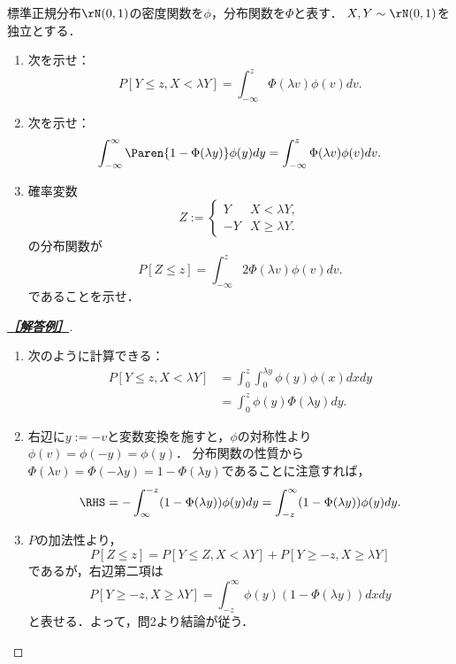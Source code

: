 \documentclass[uplatex,dvipdfmx]{jsarticle}
\begin{document}
\begin{tcolorbox}[colframe=ForestGreen, colback=ForestGreen!10!white,breakable,colbacktitle=ForestGreen!40!white,coltitle=black,fonttitle=\bfseries\sffamily,
    title=第３問]
    \begin{problem}
        標準正規分布$\rN(0,1)$の密度関数を$\phi$，分布関数を$\Phi$と表す．
        $X,Y\sim\rN(0,1)$を独立とする．
        \begin{enumerate}[{問}1]
            \item 次を示せ：
            \[P[Y\le z,X<\lambda Y]=\int^z_{-\infty}\Phi(\lambda v)\phi(v)dv.\]
            \item 次を示せ：
            \[\int^\infty_{-\infty}\Paren{1-\Phi(\lambda y)}\phi(y)dy=\int^z_{-\infty}\Phi(\lambda v)\phi(v)dv.\]
            \item 確率変数
            \[Z:=\begin{cases}
                Y&X<\lambda Y,\\
                -Y&X\ge\lambda Y.
            \end{cases}\]
            の分布関数が
            \[P[Z\le z]=\int^z_{-\infty}2\Phi(\lambda v)\phi(v)dv.\]
            であることを示せ．
        \end{enumerate}
    \end{problem}
\end{tcolorbox}
\begin{proof}[\textbf{\underline{［解答例］}}]\mbox{}
    \begin{enumerate}
        \item 次のように計算できる：
        \begin{align*}
            P[Y\le z,X<\lambda Y]&=\int^z_0\int^{\lambda y}_0\phi(y)\phi(x)dxdy\\
            &=\int^z_0\phi(y)\Phi(\lambda y)dy.
        \end{align*}
        \item 右辺に$y:=-v$と変数変換を施すと，$\phi$の対称性より$\phi(v)=\phi(-y)=\phi(y)$．
        分布関数の性質から$\Phi(\lambda v)=\Phi(-\lambda y)=1-\Phi(\lambda y)$であることに注意すれば，
        \[\RHS=-\int^{-z}_\infty(1-\Phi(\lambda y))\phi(y)dy=\int^\infty_{-z}(1-\Phi(\lambda y))\phi(y)dy.\]
        \item $P$の加法性より，
        \[P[Z\le z]=P[Y\le Z,X<\lambda Y]+P[Y\ge-z,X\ge\lambda Y]\]
        であるが，右辺第二項は
        \[P[Y\ge-z,X\ge\lambda Y]=\int^\infty_{-z}\phi(y)(1-\Phi(\lambda y))dxdy\]
        と表せる．よって，問2より結論が従う．
    \end{enumerate}
\end{proof}
\end{document}
